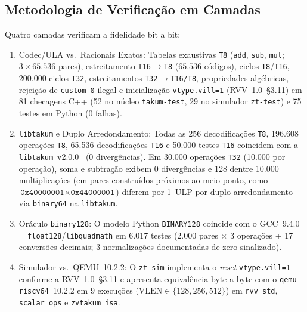 \documentclass[conference]{IEEEtran}
\begin{document}
\subsection{Metodologia de Verifica\c{c}\~ao em Camadas}
Quatro camadas verificam a fidelidade bit a bit:
\begin{enumerate}
    \item Codec/ULA vs.\ Racionais Exatos: Tabelas exaustivas \texttt{T8} (\texttt{add}, \texttt{sub}, \texttt{mul}; $3\times 65.536$ pares), estreitamento \texttt{T16$\to$T8} ($65.536$ c\'odigos), ciclos \texttt{T8}/\texttt{T16}, 200.000 ciclos \texttt{T32}, estreitamentos \texttt{T32$\to$T16/T8}, propriedades alg\'ebricas, rejei\c{c}\~ao de \texttt{custom-0} ilegal e inicializa\c{c}\~ao \texttt{vtype.vill=1} (RVV~1.0~\S3.11) em 81 checagens C++ (52 no n\'ucleo \texttt{takum-test}, 29 no simulador \texttt{zt-test}) e 75 testes em Python (0 falhas).
    \item \texttt{libtakum} e Duplo Arredondamento: Todas as 256 decodifica\c{c}\~oes \texttt{T8}, 196.608 opera\c{c}\~oes \texttt{T8}, 65.536 decodifica\c{c}\~oes \texttt{T16} e 50.000 testes \texttt{T16} coincidem com a \texttt{libtakum}~v2.0.0~\cite{libtakum} (0 diverg\^encias). Em 30.000 opera\c{c}\~oes \texttt{T32} (10.000 por opera\c{c}\~ao), soma e subtra\c{c}\~ao exibem 0 diverg\^encias e 128 dentre 10.000 multiplica\c{c}\~oes (em pares constru\'idos pr\'oximos ao meio-ponto, como $\texttt{0x40000001} \times \texttt{0x44000001}$) diferem por 1~ULP por duplo arredondamento via \texttt{binary64} na \texttt{libtakum}.
    \item Or\'aculo \texttt{binary128}: O modelo Python \texttt{BINARY128} coincide com o GCC~9.4.0 \texttt{\_\_float128}/\texttt{libquadmath} em 6.017 testes (2.000 pares $\times$ 3 opera\c{c}\~oes + 17 convers\~oes decimais; 3 normaliza\c{c}\~oes documentadas de zero sinalizado).
    \item Simulador vs.\ QEMU~10.2.2: O \texttt{zt-sim} implementa o \emph{reset} \texttt{vtype.vill=1} conforme a RVV~1.0~\S3.11 e apresenta equival\^encia byte a byte com o \texttt{qemu-riscv64}~10.2.2 em 9 execu\c{c}\~oes ($\mathrm{VLEN}\in\{128,256,512\}$) em \texttt{rvv\_std}, \texttt{scalar\_ops} e \texttt{zvtakum\_isa}.
\end{enumerate}
\end{document}
